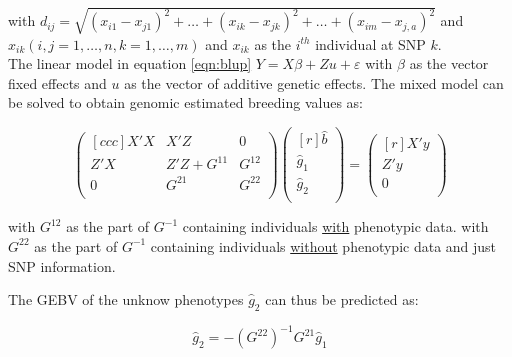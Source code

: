 with $d_{ij} = \sqrt{(x_{i1} -  x_{j1})^2 + \dots + (x_{ik} - x_{jk})^2 + \dots +  (x_{im} - x_{j,a})^2 }$ and
$ x_{ik}(i,j = 1, \dots , n,k = 1, \dots , m)$ and $x_{ik}$ as the $i^{th}$ individual at SNP $k$. \\


The linear model in equation \ref{eqn:blup} $Y = X \beta + Zu + \varepsilon$ with $\beta$ as the vector fixed
effects and $u$ as the vector of additive genetic effects.
The mixed model can be solved to obtain genomic estimated breeding values as:


\begin{equation}
  \begin{pmatrix}[ccc]
    X'X & X'Z & 0 \\ 
    Z'X & Z'Z + G^{11} & G^{12} \\ 
    0 & G^{21} & G^{22} \\ 
  \end{pmatrix}
  \begin{pmatrix}[r]
    \hat{b} \\ 
    \hat{g}_1 \\ 
    \hat{g}_2 \\ 
  \end{pmatrix}
  =
  \begin{pmatrix}[r]
    X'y \\ 
    Z'y \\ 
    0 \\ 
  \end{pmatrix}
  \label{eqn:pBLUP}
\end{equation}

with $G^{12}$ as the part of $G^{-1}$ containing individuals \underline{with} phenotypic data.
with $G^{22}$ as the part of $G^{-1}$ containing individuals \underline{without} phenotypic data and just SNP  information. 

The GEBV of the unknow phenotypes $\hat{g}_2$ can thus be predicted as:

\begin{equation}
\hat{g}_2 = -\left( G^{22}\right)^{-1}G^{21}\hat{g}_1
\label{eqn:gpred}
\end{equation}

 




